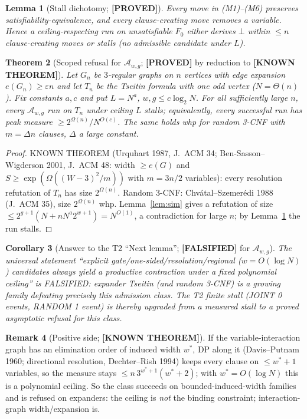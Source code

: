 \documentclass[11pt]{article}
\newtheorem{theorem}{Theorem}
\newtheorem{lemma}[theorem]{Lemma}
\newtheorem{corollary}[theorem]{Corollary}
\theoremstyle{definition}
\newtheorem{remark}[theorem]{Remark}
\newcommand{\lab}[1]{\textbf{[#1]}}
\begin{document}
\begin{lemma}[Stall dichotomy; \lab{PROVED}]\label{lem:stall}
Every move in (M1)--(M6) preserves satisfiability-equivalence, and every clause-creating move removes a variable.
Hence a ceiling-respecting run on unsatisfiable $F_0$ either derives $\bot$ within $\le n$ clause-creating moves or
\emph{stalls} (no admissible candidate under $L$).
\end{lemma}

\begin{theorem}[Scoped refusal for $\mathcal A_{w,g}$; \lab{PROVED} by reduction to \lab{KNOWN THEOREM}]\label{thm:main}
Let $G_n$ be $3$-regular graphs on $n$ vertices with edge expansion $e(G_n)\ge \varepsilon n$ and let $T_n$ be
the Tseitin formula with one odd vertex ($N=\Theta(n)$). Fix constants $a,c$ and put $L=N^a$, $w,g\le c\log_2 N$.
For all sufficiently large $n$, \emph{every} $\mathcal A_{w,g}$ run on $T_n$ under ceiling $L$ stalls; equivalently,
every successful run has peak measure $\ge 2^{\Omega(n)}/N^{O(c)}$. The same holds whp for random 3-CNF with
$m=\Delta n$ clauses, $\Delta$ a large constant.
\end{theorem}
\begin{proof}
KNOWN THEOREM (Urquhart 1987, J.\ ACM 34; Ben-Sasson--Wigderson 2001, J.\ ACM 48: width $\ge e(G)$ and
$S\ge\exp(\Omega((W-3)^2/m))$ with $m=3n/2$ variables): every resolution refutation of $T_n$ has size
$2^{\Omega(n)}$. Random 3-CNF: Chv\'atal--Szemer\'edi 1988 (J.\ ACM 35), size $2^{\Omega(n)}$ whp.
Lemma~\ref{lem:sim} gives a refutation of size $\le 2^{g+1}(N+nN^a2^{w+1})=N^{O(1)}$, a contradiction for large $n$;
by Lemma~\ref{lem:stall} the run stalls.
\end{proof}

\begin{corollary}[Answer to the T2 ``Next lemma''; \lab{FALSIFIED} for $\mathcal A_{w,g}$]
The universal statement ``explicit gate/one-sided/resolution/regional ($w=O(\log N)$) candidates always yield a
productive contraction under a fixed polynomial ceiling'' is FALSIFIED: expander Tseitin (and random 3-CNF) is a
growing family defeating precisely this admission class. The T2 finite stall (JOINT 0 events, RANDOM 1 event) is
thereby upgraded from a measured stall to a proved asymptotic refusal for this class.
\end{corollary}

\begin{remark}[Positive side; \lab{KNOWN THEOREM}]
If the variable-interaction graph has an elimination order of induced width $w^*$, DP along it (Davis--Putnam 1960;
directional resolution, Dechter--Rish 1994) keeps every clause on $\le w^*+1$ variables, so the measure stays
$\le n\,3^{w^*+1}(w^*+2)$; with $w^*=O(\log N)$ this is a polynomial ceiling. So the class succeeds on
bounded-induced-width families and is refused on expanders: the ceiling is \emph{not} the binding constraint;
interaction-graph width/expansion is.
\end{remark}
\end{document}
